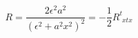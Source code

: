 \begin{equation}
R = \frac{2\epsilon^2 a^2}{(\epsilon^2 + a^2 x^2)^2} = - \frac{1}{2} R^t_{\phantom{t}x tx}
\label{reqn}
\end{equation}

